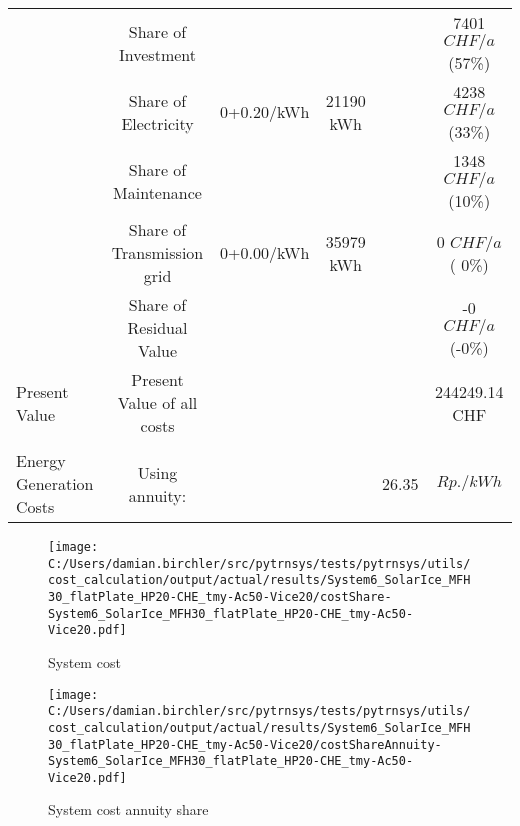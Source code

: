 \documentclass[english]{SPFShortReport}
\begin{document}
\begin{table}[!ht]
\begin{adjustbox}{max width =\textwidth}
\begin{tabular}{l | c c c c c }
 & Share of Investment & &&& 7401 $CHF/a$ (57\%) \\ 
 & Share of Electricity  & 0+0.20/kWh & 21190 kWh&  & 4238 $CHF/a$ (33\%)\\ 
 & Share of Maintenance & &&& 1348 $CHF/a$ (10\%)\\ 
 & Share of Transmission grid & 0+0.00/kWh & 35979  kWh & &  0 $CHF/a$ ( 0\%)\\ 
 & Share of Residual Value &&& & -0 $CHF/a$ (-0\%)\\ 
Present Value  & Present Value of all costs  & &&& 244249.14 CHF  \\ 
\hline \\ 
 Energy Generation Costs & Using annuity: &&& 26.35 & $Rp./kWh$ \\ 
\hline
\hline
\end{tabular}
\end{adjustbox}
\label{CostsTable}
\end{table}
\begin{figure}[!htbp]
\begin{center}
\texttt{[image: C:/Users/damian.birchler/src/pytrnsys/tests/pytrnsys/utils/cost\_calculation/output/actual/results/System6\_SolarIce\_MFH30\_flatPlate\_HP20-CHE\_tmy-Ac50-Vice20/costShare-System6\_SolarIce\_MFH30\_flatPlate\_HP20-CHE\_tmy-Ac50-Vice20.pdf]}
\caption{System cost}
\label{systemCost}
\end{center}
\end{figure}
\begin{figure}[!htbp]
\begin{center}
\texttt{[image: C:/Users/damian.birchler/src/pytrnsys/tests/pytrnsys/utils/cost\_calculation/output/actual/results/System6\_SolarIce\_MFH30\_flatPlate\_HP20-CHE\_tmy-Ac50-Vice20/costShareAnnuity-System6\_SolarIce\_MFH30\_flatPlate\_HP20-CHE\_tmy-Ac50-Vice20.pdf]}
\caption{System cost annuity share}
\label{systemCostannuity}
\end{center}
\end{figure}
\end{document}
